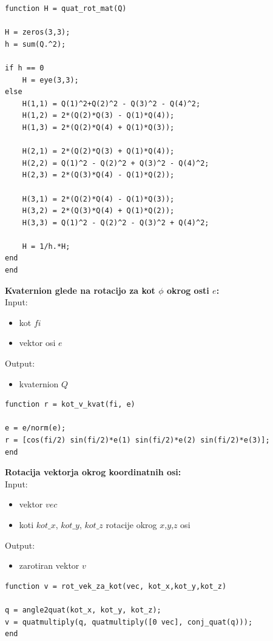 \documentclass[12pt,a4paper,twoside]{article}
\theoremstyle{definition} %
\theoremstyle{plain} %
\numberwithin{equation}{section}  %
\begin{document}
\begin{lstlisting}[caption = {quat\_rot\_mat}]
function H = quat_rot_mat(Q)

H = zeros(3,3);
h = sum(Q.^2);

if h == 0
    H = eye(3,3);
else
    H(1,1) = Q(1)^2+Q(2)^2 - Q(3)^2 - Q(4)^2;
    H(1,2) = 2*(Q(2)*Q(3) - Q(1)*Q(4));
    H(1,3) = 2*(Q(2)*Q(4) + Q(1)*Q(3));

    H(2,1) = 2*(Q(2)*Q(3) + Q(1)*Q(4));
    H(2,2) = Q(1)^2 - Q(2)^2 + Q(3)^2 - Q(4)^2;
    H(2,3) = 2*(Q(3)*Q(4) - Q(1)*Q(2));

    H(3,1) = 2*(Q(2)*Q(4) - Q(1)*Q(3));
    H(3,2) = 2*(Q(3)*Q(4) + Q(1)*Q(2));
    H(3,3) = Q(1)^2 - Q(2)^2 - Q(3)^2 + Q(4)^2;

    H = 1/h.*H;  
end
end
\end{lstlisting}

\vspace{1cm}
\textbf{Kvaternion glede na rotacijo za kot $\phi$ okrog osti $e$:}\\
Input:
\begin{itemize}
\item kot $fi$
\item vektor osi $e$
\end{itemize}
Output:
\begin{itemize}
\item kvaternion $Q$
\end{itemize}

\begin{lstlisting}[caption = {kot\_v\_kvat}]
function r = kot_v_kvat(fi, e)

e = e/norm(e);
r = [cos(fi/2) sin(fi/2)*e(1) sin(fi/2)*e(2) sin(fi/2)*e(3)];
end
\end{lstlisting}

\newpage

\textbf{Rotacija vektorja okrog koordinatnih osi:}\\
Input:
\begin{itemize}
\item vektor $vec$
\item koti $kot\_x$, $kot\_y$, $kot\_z$ rotacije okrog $x$,$y$,$z$ osi
\end{itemize}
Output:
\begin{itemize}
\item zarotiran vektor $v$
\end{itemize}

\begin{lstlisting}[caption = {rot\_vek\_za\_kot}]
function v = rot_vek_za_kot(vec, kot_x,kot_y,kot_z)

q = angle2quat(kot_x, kot_y, kot_z);
v = quatmultiply(q, quatmultiply([0 vec], conj_quat(q)));
end
\end{lstlisting}
\end{document}
